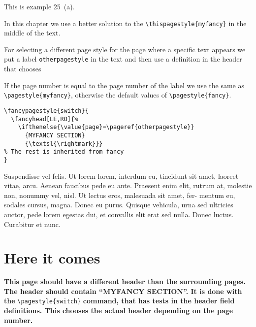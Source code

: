 \documentclass[openany]{book}
\begin{document}
\begin{boxedminipage}{\textwidth}
This is example 25~(a).

In this chapter we use a better solution to the \verb|\thispagestyle{myfancy}| in the middle of the text.

For selecting a different page style for the page where a specific text appears we put a label \texttt{otherpagestyle} in the text and then use a definition in the header that chooses

 If the page number is equal to the page number of the label we use the same as \verb|\pagestyle{myfancy}|, otherwise the default values of \verb|\pagestyle{fancy}|.

\begin{verbatim}
\fancypagestyle{switch}{
  \fancyhead[LE,RO]{%
    \ifthenelse{\value{page}=\pageref{otherpagestyle}}
      {MYFANCY SECTION}
      {\textsl{\rightmark}}}
% The rest is inherited from fancy
}
\end{verbatim}
\end{boxedminipage}

\bigskip

\lipsum[6-8]

\bigskip
Suspendisse vel felis. Ut lorem lorem, interdum eu, tincidunt sit amet, laoreet vitae, arcu. Aenean faucibus pede eu ante. Praesent enim elit, rutrum at, molestie non, nonummy vel, nisl. Ut lectus eros, malesuada sit amet, fer- mentum eu, sodales cursus, magna. Donec eu purus. Quisque vehicula, urna sed ultricies auctor, pede lorem egestas dui, et convallis elit erat sed nulla. Donec luctus. Curabitur et nunc. 

\section{Here it comes}

\noindent
\begin{boxedminipage}{\textwidth}
\begin{minipage}{\linewidth}
  \textbf{This page should have a different header than the surrounding
    pages. The header should contain \textnormal{``MYFANCY SECTION''}.
    \label{otherpagestyle}
    It is done with the} \verb|\pagestyle{switch}| \textbf{command, that
    has tests in the header field definitions. This chooses the actual
    header depending on the page number.}
\end{minipage}
\end{boxedminipage}
\bigskip

\lipsum[8-10]
\end{document}
